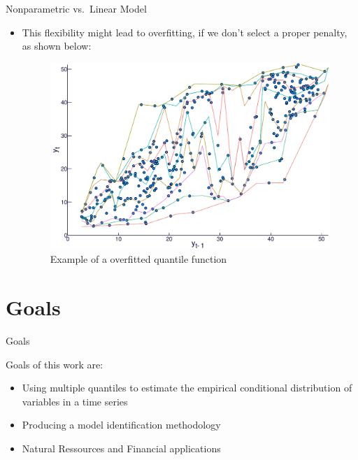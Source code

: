\documentclass[ignorenonframetext,]{beamer}
\providecommand{\tightlist}{%
\setlength{\itemsep}{0pt}\setlength{\parskip}{0pt}}
\begin{document}
\begin{frame}{Nonparametric vs.~Linear Model}

\begin{itemize}
\tightlist
\item
  This flexibility might lead to overfitting, if we don't select a
  proper penalty, as shown below:

  \begin{figure}
          \centering     \includegraphics[width=0.6 \textwidth]{../Figuras/regressao-quantilica/icaraizinho-crossing-01}
  \caption{Example of a overfitted quantile function}
  \label{fig:convergence}
  \end{figure}
\end{itemize}

\end{frame}

\section{Goals}\label{goals}

\begin{frame}{Goals}

Goals of this work are:

\begin{itemize}
\item
  Using multiple quantiles to estimate the empirical conditional
  distribution of variables in a time series
\item
  Producing a model identification methodology
\item
  Natural Ressources and Financial applications
\end{itemize}

\end{frame}
\end{document}
